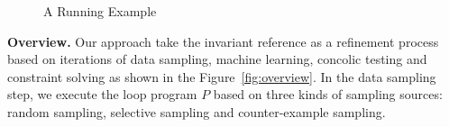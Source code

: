 \begin{figure}[t]
\begin{minipage}{.5\textwidth}
        \caption{A Running Example}
        \label{example:running}
    \end{minipage}
\end{figure}

\medskip\noindent
\textbf{Overview.}
Our approach take the invariant reference as a refinement process 
based on iterations of data sampling, machine learning, concolic testing 
and constraint solving as shown in the Figure~\ref{fig:overview}. 
In the data sampling step, we execute the loop program $P$ based on three kinds of sampling sources: 
random sampling, selective sampling and counter-example sampling. 




